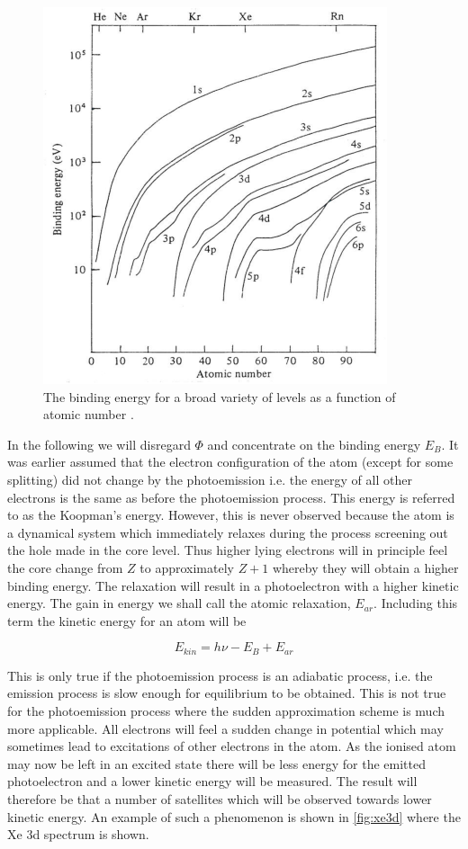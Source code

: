 \begin{figure}[h!]
	\begin{center}
	\includegraphics[scale=4]{figures/04_14.png}
	\caption{The binding energy for a broad variety of levels as a function of atomic number \cite{siegbahn1}.}
	\label{fig:bindingenergies}
	\end{center}
\end{figure}

In the following we will disregard $\Phi$ and concentrate on the binding energy $E_{B}$. It was earlier assumed that the electron configuration of the atom (except for some splitting) did not change by the photoemission i.e. the energy of all other electrons is the same as before the photoemission process. This energy is referred to as the Koopman's energy. However, this is never observed  because the atom is a dynamical system which immediately relaxes during the  process screening out the hole made in the core level. Thus higher lying electrons will in principle feel the core change from $Z$ to approximately $Z+1$ whereby they will obtain a higher binding energy. The relaxation will result in a photoelectron with a higher kinetic  energy. The gain in energy we shall call the  atomic  relaxation, $E_{ar}$. Including this term the kinetic energy for an atom will be

\begin{equation}
E_{kin}=h\nu-E_{B}+E_{ar}
\end{equation}

This is only true if the photoemission process is an adiabatic process, i.e. the emission process is slow enough for equilibrium to be obtained. This is not true for the photoemission process where the sudden approximation scheme is much more applicable. All electrons will feel a sudden change in potential which may sometimes lead to excitations of other electrons in the atom. As the ionised atom may now be left in an excited state there will be less energy for the emitted photoelectron and a lower kinetic energy will be measured. The result will therefore be that a number of satellites which will be observed towards lower kinetic energy. An example of such a phenomenon is shown in \autoref{fig:xe3d} where the Xe 3d spectrum is shown.

